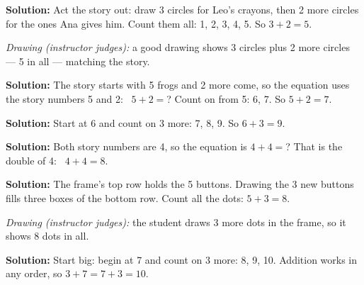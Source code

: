 \documentclass[12pt]{article}
\begin{document}




\textbf{Solution:} Act the story out: draw 3 circles for Leo's crayons, then
2 more circles for the ones Ana gives him. Count them all: 1, 2, 3, 4, 5.
So $3 + 2 = 5$. 

\emph{Drawing (instructor judges):} a good drawing shows 3 circles plus 2
more circles --- 5 in all --- matching the story.


\textbf{Solution:} The story starts with 5 frogs and 2 more come, so the
equation uses the story numbers 5 and 2: \ $5 + 2 = {}$? Count on from 5:
6, 7. So $5 + 2 = 7$. 


\textbf{Solution:} Start at 6 and count on 3 more: 7, 8, 9. So $6 + 3 = 9$.


\textbf{Solution:} Both story numbers are 4, so the equation is
$4 + 4 = {}$? That is the double of 4: \ $4 + 4 = 8$. 


\textbf{Solution:} The frame's top row holds the 5 buttons. Drawing the 3 new
buttons fills three boxes of the bottom row. Count all the dots: $5 + 3 = 8$.

\emph{Drawing (instructor judges):} the student draws 3 more dots in the
frame, so it shows 8 dots in all.


\textbf{Solution:} Start big: begin at 7 and count on 3 more: 8, 9, 10.
Addition works in any order, so $3 + 7 = 7 + 3 = 10$. 
\end{document}
